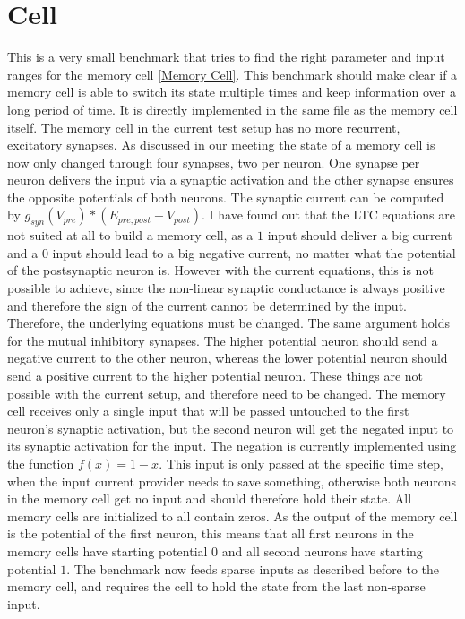 \documentclass[draft,final]{vutinfth} %
\begin{document}
    \section{Cell}
    This is a very small benchmark that tries to find the right parameter and input ranges for the memory cell \ref{Memory Cell}.
    This benchmark should make clear if a memory cell is able to switch its state multiple times and keep information over a long period of time.
    It is directly implemented in the same file as the memory cell itself.
    The memory cell in the current test setup has no more recurrent, excitatory synapses.
    As discussed in our meeting the state of a memory cell is now only changed through four synapses, two per neuron.
    One synapse per neuron delivers the input via a synaptic activation and the other synapse ensures the opposite potentials of both neurons.
    The synaptic current can be computed by $g_{syn}(V_{pre}) * (E_{pre,post} - V_{post})$.
    I have found out that the LTC equations are not suited at all to build a memory cell, as a $1$ input should deliver a big current and a $0$ input should lead to a big negative current, no matter what the potential of the postsynaptic neuron is.
    However with the current equations, this is not possible to achieve, since the non-linear synaptic conductance is always positive and therefore the sign of the current cannot be determined by the input.
    Therefore, the underlying equations must be changed.
    The same argument holds for the mutual inhibitory synapses. The higher potential neuron should send a negative current to the other neuron, whereas the lower potential neuron should send a positive current to the higher potential neuron.
    These things are not possible with the current setup, and therefore need to be changed.
    The memory cell receives only a single input that will be passed untouched to the first neuron's synaptic activation, but the second neuron will get the negated input to its synaptic activation for the input.
    The negation is currently implemented using the function $f(x) = 1-x$.
    This input is only passed at the specific time step, when the input current provider needs to save something, otherwise both neurons in the memory cell get no input and should therefore hold their state.
    All memory cells are initialized to all contain zeros.
    As the output of the memory cell is the potential of the first neuron, this means that all first neurons in the memory cells have starting potential $0$ and all second neurons have starting potential $1$.
    The benchmark now feeds sparse inputs as described before to the memory cell, and requires the cell to hold the state from the last non-sparse input.
\end{document}
